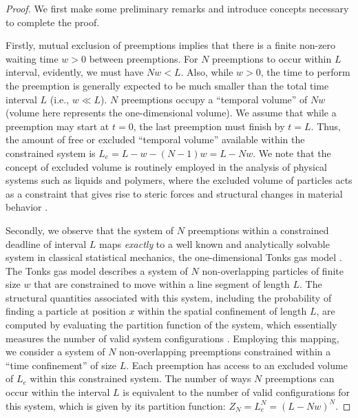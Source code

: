 \documentclass[compsoc]{IEEEtran}
\begin{document}
\begin{proof} 
We first make some preliminary remarks and introduce concepts necessary to complete the proof. 

Firstly, mutual exclusion of preemptions implies that there is a finite non-zero waiting time $w>0$ between preemptions. 
For $N$ preemptions to occur within $L$ interval, evidently, we must have $N w < L$. Also, while $w >0$, the time to perform the preemption is generally expected to be much smaller than the total time interval $L$ (i.e., $w \ll L$).
$N$ preemptions occupy a ``temporal volume'' of $Nw$ (volume here represents the one-dimensional volume). We assume that while a preemption may start at $t=0$, the last preemption must finish by $t = L$. Thus, the amount of free or excluded ``temporal volume'' available within the constrained system is $L_e = L - w - (N-1)w = L - Nw$.
We note that the concept of excluded volume is routinely employed in the analysis of physical systems such as liquids and polymers, where the excluded volume of particles acts as a constraint that gives rise to steric forces and structural changes in material behavior \cite{krauth2006statistical,jing2015ionic,solis2013generating}. 

Secondly, we observe that the system of $N$ preemptions within a constrained deadline of interval $L$ maps \emph{exactly} to a well known and analytically solvable system in classical statistical mechanics, the one-dimensional Tonks gas model \cite{tonks}. The Tonks gas model describes a system of $N$ non-overlapping particles of finite size $w$ that are constrained to move within a line segment of length $L$. The structural quantities associated with this system, including the probability of finding a particle at position $x$ within the spatial confinement of length $L$, are computed by evaluating the partition function of the system, which essentially measures the number of valid system configurations \cite{krauth2006statistical}. 
Employing this mapping, we consider a system of $N$ non-overlapping preemptions constrained within a ``time confinement'' of size $L$. Each preemption has access to an excluded volume of $L_e$ within this constrained system. 
The number of ways $N$ preemptions can occur within the interval $L$ is equivalent to the number of valid configurations for this system, which is given by its partition function: $Z_N = L_e^N = (L- Nw)^N$.


\end{proof}
\end{document}
